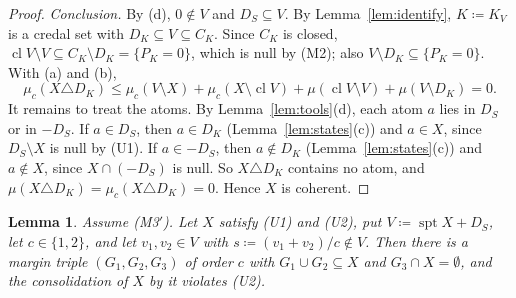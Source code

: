 \documentclass[11pt]{article}
\DeclareMathOperator{\cl}{cl}
\DeclareMathOperator{\spt}{spt}
\theoremstyle{plain}
\newtheorem{lemma}[theorem]{Lemma}
\theoremstyle{definition}
\theoremstyle{remark}
\begin{document}
\begin{proof}
\emph{Conclusion.} By (d), $0\notin V$ and $D_S\subseteq V$. By Lemma~\ref{lem:identify},
$K\coloneqq K_V$ is a credal set with $D_K\subseteq V\subseteq C_K$. Since $C_K$ is closed,
$\cl V\setminus V\subseteq C_K\setminus D_K=\{P_K=0\}$, which is null by (M2); also $V\setminus
D_K\subseteq\{P_K=0\}$. With (a) and (b),
\[
  \mu_c(X\triangle D_K)\le\mu_c(V\setminus X)+\mu_c(X\setminus\cl V)+\mu(\cl V\setminus V)+
  \mu(V\setminus D_K)=0 .
\]
It remains to treat the atoms. By Lemma~\ref{lem:tools}(d), each atom $a$ lies in $D_S$ or in
$-D_S$. If $a\in D_S$, then $a\in D_K$ (Lemma~\ref{lem:states}(c)) and $a\in X$, since
$D_S\setminus X$ is null by (U1). If $a\in-D_S$, then $a\notin D_K$
(Lemma~\ref{lem:states}(c)) and $a\notin X$, since $X\cap(-D_S)$ is null. So $X\triangle D_K$
contains no atom, and $\mu(X\triangle D_K)=\mu_c(X\triangle D_K)=0$. Hence $X$ is coherent.
\end{proof}

\begin{lemma}\label{lem:gap}
Assume (M3$'$). Let $X$ satisfy (U1) and (U2), put $V\coloneqq\spt X+D_S$, let $c\in\{1,2\}$,
and let $v_1,v_2\in V$ with $s\coloneqq(v_1+v_2)/c\notin V$. Then there is a margin triple
$(G_1,G_2,G_3)$ of order $c$ with $G_1\cup G_2\subseteq X$ and $G_3\cap X=\emptyset$, and the
consolidation of $X$ by it violates (U2).
\end{lemma}
\end{document}
